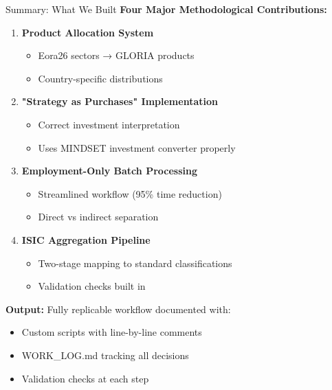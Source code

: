 \documentclass[10pt]{beamer}
\begin{document}

\begin{frame}{Summary: What We Built}
\textbf{Four Major Methodological Contributions:}

\vspace{0.3cm}

\begin{enumerate}
    \item \textbf{Product Allocation System}
    \begin{itemize}
        \item Eora26 sectors → GLORIA products
        \item Country-specific distributions
    \end{itemize}

    \vspace{0.2cm}

    \item \textbf{"Strategy as Purchases" Implementation}
    \begin{itemize}
        \item Correct investment interpretation
        \item Uses MINDSET investment converter properly
    \end{itemize}

    \vspace{0.2cm}

    \item \textbf{Employment-Only Batch Processing}
    \begin{itemize}
        \item Streamlined workflow (95\% time reduction)
        \item Direct vs indirect separation
    \end{itemize}

    \vspace{0.2cm}

    \item \textbf{ISIC Aggregation Pipeline}
    \begin{itemize}
        \item Two-stage mapping to standard classifications
        \item Validation checks built in
    \end{itemize}
\end{enumerate}

\vspace{0.5cm}

\textbf{Output:} Fully replicable workflow documented with:
\begin{itemize}
    \item Custom scripts with line-by-line comments
    \item WORK\_LOG.md tracking all decisions
    \item Validation checks at each step
\end{itemize}

\end{frame}
\end{document}
